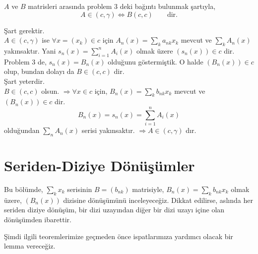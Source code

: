 \begin{prob}
$A$ ve $B$ matrisleri arasında problem 3 deki bağıntı bulunmak şartıyla,
$$
A\in(c,\gamma)\iff B(c,c)\qquad\text{dir.}
$$
\end{prob}
\begin{coz}
Şart gerektir.\\[5pt]
$A\in(c,\gamma)$ ise $\forall x=(x_k)\in c$ için $A_n(x)=\sum_ka_{nk}x_k$ mevcut ve $\sum_kA_n(x)$  yakınsaktır. Yani $s_n(x)=\sum\limits_{i=1}^nA_i(x)$ olmak üzere $(s_n(x))\in c$ dir. Problem 3 de, $s_n(x)=B_n(x)$ olduğunu göstermiştik. O halde $(B_n(x))\in c$ olup, bundan dolayı da $B\in(c,c)$ dir.\\[5pt]
Şart yeterdir.\\[5pt]
$B\in(c,c)$ olsun. $\Rightarrow \forall x\in c$ için, $B_n(x)=\sum_kb_{nk}x_k$ mevcut ve $(B_n(x))\in c$ dir.
$$
B_n(x)=s_n(x)=\sum\limits_{i=1}^nA_i(x)
$$
olduğundan $\sum_nA_n(x)$ serisi yakınsaktır. $\Rightarrow A\in (c,\gamma)$ dır.
\end{coz}
\newpage

\section{Seriden-Diziye Dönüşümler}

Bu bölümde, $\sum\limits_kx_k$ serisinin $B=(b_{nk})$ matrisiyle, $B_n(x)=\sum\limits_kb_{nk}x_k$ olmak üzere, $(B_n(x))$ dizisine dönüşümünü inceleyeceğiz. Dikkat edilirse, aslında her seriden diziye dönüşüm, bir dizi uzayından diğer bir dizi uzayı içine olan dönüşümden ibarettir.

Şimdi ilgili teoremlerimize geçmeden önce ispatlarımıza yardımcı olacak bir lemma vereceğiz.

